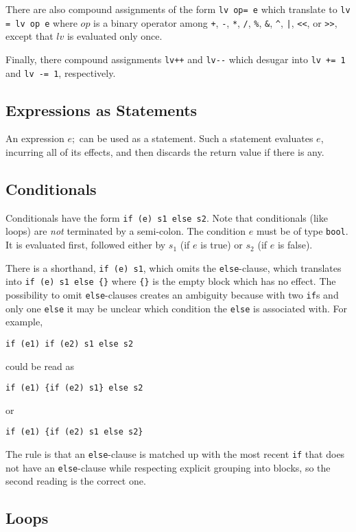 \documentclass[11pt]{article}
\newcommand{\tbool}{\texttt{bool}}
\begin{document}
There are also compound assignments of the form
\verb'lv op= e' which translate to \verb'lv = lv op e'
where $op$ is a binary operator among \verb'+', \verb'-',
\verb'*', \verb'/', \verb'%', \verb'&', \verb'^', \verb'|',
\verb'<<', or \verb'>>', except that $lv$ is evaluated
only once.

Finally, there compound assignments \verb'lv++' and \verb'lv--'
which desugar into \verb'lv += 1' and \verb'lv -= 1',
respectively.

\subsection{Expressions as Statements}

An expression $e;$ can be used as a statement.  Such a
statement evaluates $e$, incurring all of its effects, and
then discards the return value if there is any.

\subsection{Conditionals}

Conditionals have the form \verb'if (e) s1 else s2'.
Note that conditionals (like loops) are \emph{not} terminated by
a semi-colon.  The condition $e$ must be of type \tbool.
It is evaluated first, followed either by $s_1$ (if $e$ is true)
or $s_2$ (if $e$ is false).

There is a shorthand, \verb'if (e) s1', which omits the
\verb'else'-clause, which translates into \verb'if (e) s1 else {}'
where \verb'{}' is the empty block which has no effect.  The
possibility to omit \verb'else'-clauses creates an ambiguity because
with two \verb'if's and only one \verb'else' it may be unclear which
condition the \verb'else' is associated with.  For example,
\begin{verbatim}
if (e1) if (e2) s1 else s2
\end{verbatim}
could be read as
\begin{verbatim}
if (e1) {if (e2) s1} else s2
\end{verbatim}
or
\begin{verbatim}
if (e1) {if (e2) s1 else s2}
\end{verbatim}
The rule is that an \verb'else'-clause is matched up with the most
recent \verb'if' that does not have an \verb'else'-clause while
respecting explicit grouping into blocks, so the second reading
is the correct one.

\subsection{Loops}
\end{document}
